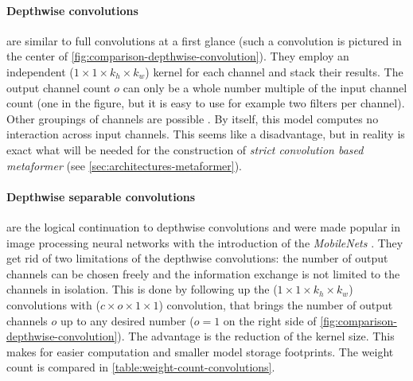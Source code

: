 \paragraph{Depthwise convolutions} are similar to full convolutions at a first glance (such a convolution is pictured in the center of \autoref{fig:comparison-depthwise-convolution}).
They employ an independent ($1\times 1 \times k_h \times k_w$) kernel for each channel and stack their results.
The output channel count $o$ can only be a whole number multiple of the input channel count (one in the figure, but it is easy to use for example two filters per channel).
Other groupings of channels are possible \cite{channelNets}.
By itself, this model computes no interaction across input channels. 
This seems like a disadvantage, but in reality is exact what will be needed for the construction of \emph{strict convolution based metaformer} (see \autoref{sec:architectures-metaformer}).

\paragraph{Depthwise separable convolutions} are the logical continuation to depthwise convolutions and were made popular in image processing neural networks with the introduction of the \emph{MobileNets} \cite{mobileNetPaper}.
They get rid of two limitations of the depthwise convolutions: the number of output channels can be chosen freely and the information exchange is not limited to the channels in isolation.
This is done by following up the ($1\times 1 \times k_h \times k_w$) convolutions with ($c \times o \times 1 \times 1$) convolution, that brings the number of output channels $o$ up to any desired number ($o =1$ on the right side of \autoref{fig:comparison-depthwise-convolution}).
The advantage is the reduction of the kernel size. This makes for easier computation and smaller model storage footprints. 
The weight count is compared in \autoref{table:weight-count-convolutions}.

